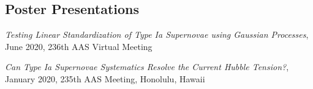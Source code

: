 \documentclass[margin]{res}
\begin{document}
\begin{resume}











\section{Poster Presentations}
\hangindent=15pt 
{\sl Testing Linear Standardization of Type Ia Supernovae using Gaussian Processes}, June 2020, 236th AAS Virtual Meeting
\vspace{-12pt}

\hangindent=15pt 
{\sl Can Type Ia Supernovae Systematics Resolve the Current Hubble Tension?}, January 2020, 235th AAS Meeting, Honolulu, Hawaii
\vspace{-12pt}


\end{resume}
\end{document}
